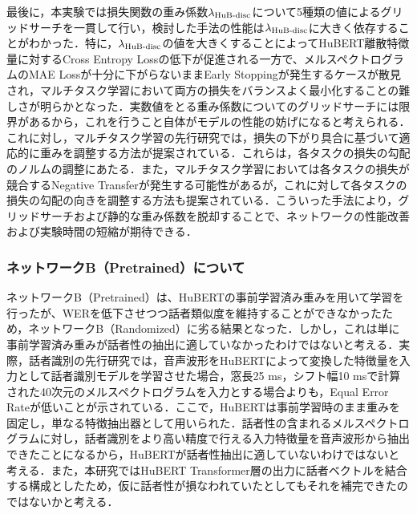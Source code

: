 最後に，本実験では損失関数の重み係数$\lambda_{\text{HuB-disc}}$について5種類の値によるグリッドサーチを一貫して行い，検討した手法の性能は$\lambda_{\text{HuB-disc}}$に大きく依存することがわかった．特に，$\lambda_{\text{HuB-disc}}$の値を大きくすることによってHuBERT離散特徴量に対するCross Entropy Lossの低下が促進される一方で、メルスペクトログラムのMAE Lossが十分に下がらないままEarly Stoppingが発生するケースが散見され，マルチタスク学習において両方の損失をバランスよく最小化することの難しさが明らかとなった．実数値をとる重み係数についてのグリッドサーチには限界があるから，これを行うこと自体がモデルの性能の妨げになると考えられる．これに対し，マルチタスク学習の先行研究では，損失の下がり具合に基づいて適応的に重みを調整する方法\cite{chen2018gradnorm,liu2019end}が提案されている．これらは，各タスクの損失の勾配のノルムの調整にあたる．また，マルチタスク学習においては各タスクの損失が競合するNegative Transfer\cite{crawshaw2020multi}が発生する可能性があるが，これに対して各タスクの損失の勾配の向きを調整する方法\cite{yu2020gradient}も提案されている．こういった手法により，グリッドサーチおよび静的な重み係数を脱却することで、ネットワークの性能改善および実験時間の短縮が期待できる．

\subsubsection{ネットワークB（Pretrained）について}
ネットワークB（Pretrained）は、HuBERTの事前学習済み重みを用いて学習を行ったが、WERを低下させつつ話者類似度を維持することができなかったため，ネットワークB（Randomized）に劣る結果となった．しかし，これは単に事前学習済み重みが話者性の抽出に適していなかったわけではないと考える．実際，話者識別の先行研究\cite{chen2022large}では，音声波形をHuBERTによって変換した特徴量を入力として話者識別モデルを学習させた場合，窓長25 ms，シフト幅10 msで計算された40次元のメルスペクトログラムを入力とする場合よりも，Equal Error Rateが低いことが示されている．ここで，HuBERTは事前学習時のまま重みを固定し，単なる特徴抽出器として用いられた．話者性の含まれるメルスペクトログラムに対し，話者識別をより高い精度で行える入力特徴量を音声波形から抽出できたことになるから，HuBERTが話者性抽出に適していないわけではないと考える．また，本研究ではHuBERT Transformer層の出力に話者ベクトルを結合する構成としたため，仮に話者性が損なわれていたとしてもそれを補完できたのではないかと考える．


